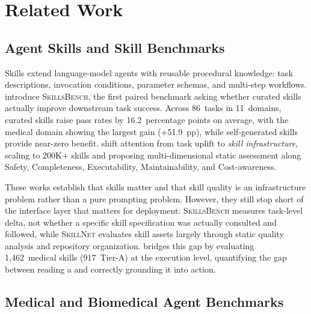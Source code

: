 \section{Related Work}
\label{sec:related_work}

\subsection{Agent Skills and Skill Benchmarks}
\label{sec:rw_skills}

Skills extend language-model agents with reusable procedural knowledge: task descriptions, invocation conditions, parameter schemas, and multi-step workflows.
\citet{skillsbench2026} introduce \textsc{SkillsBench}, the first paired benchmark asking whether curated skills actually improve downstream task success.
Across 86~tasks in 11~domains, curated skills raise pass rates by 16.2~percentage points on average, with the medical domain showing the largest gain (+51.9~pp), while self-generated skills provide near-zero benefit.
\citet{skillnet2026} shift attention from task uplift to \emph{skill infrastructure}, scaling to 200K+ skills and proposing multi-dimensional static assessment along Safety, Completeness, Executability, Maintainability, and Cost-awareness.

These works establish that skills matter and that skill quality is an infrastructure problem rather than a pure prompting problem.
However, they still stop short of the interface layer that matters for deployment: \textsc{SkillsBench} measures task-level delta, not whether a specific skill specification was actually consulted and followed, while \textsc{SkillNet} evaluates skill assets largely through static quality analysis and repository organization.
\medskillbench bridges this gap by evaluating 1,462~medical skills (917~Tier-A) at the execution level, quantifying the \rbu gap between reading a \skillmd and correctly grounding it into action.

\subsection{Medical and Biomedical Agent Benchmarks}
\label{sec:rw_medical_bench}

